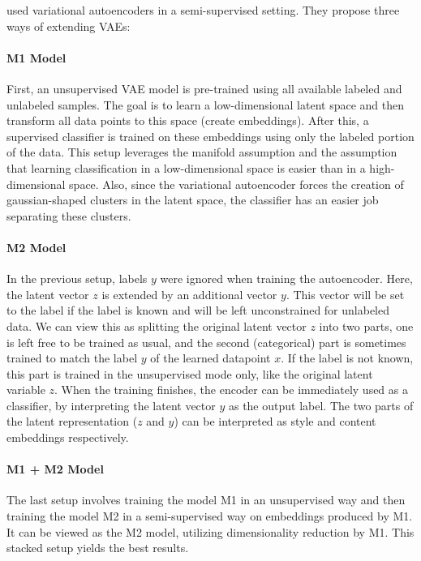 \cite{KingmaSslVae} used variational autoencoders in a semi-supervised setting. They propose three ways of extending VAEs:

\paragraph*{M1 Model}
First, an unsupervised VAE model is pre-trained using all available labeled and unlabeled samples. The goal is to learn a low-dimensional latent space and then transform all data points to this space (create embeddings). After this, a supervised classifier is trained on these embeddings using only the labeled portion of the data. This setup leverages the manifold assumption and the assumption that learning classification in a low-dimensional space is easier than in a high-dimensional space. Also, since the variational autoencoder forces the creation of gaussian-shaped clusters in the latent space, the classifier has an easier job separating these clusters.

\paragraph*{M2 Model}
In the previous setup, labels $y$ were ignored when training the autoencoder. Here, the latent vector $z$ is extended by an additional vector $y$. This vector will be set to the label if the label is known and will be left unconstrained for unlabeled data. We can view this as splitting the original latent vector $z$ into two parts, one is left free to be trained as usual, and the second (categorical) part is sometimes trained to match the label $y$ of the learned datapoint $x$. If the label is not known, this part is trained in the unsupervised mode only, like the original latent variable $z$. When the training finishes, the encoder can be immediately used as a classifier, by interpreting the latent vector $y$ as the output label. The two parts of the latent representation ($z$ and $y$) can be interpreted as style and content embeddings respectively.

\paragraph*{M1 + M2 Model}
The last setup involves training the model M1 in an unsupervised way and then training the model M2 in a semi-supervised way on embeddings produced by M1. It can be viewed as the M2 model, utilizing dimensionality reduction by M1. This stacked setup yields the best results.


